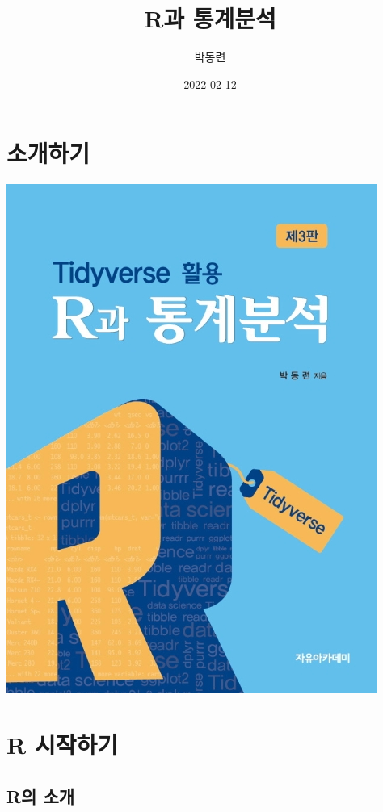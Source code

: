 \documentclass[
]{book}
\title{R과 통계분석}
\author{박동련}
\date{2022-02-12}
\begin{document}
\maketitle

{
\setcounter{tocdepth}{1}
\tableofcontents
}
\hypertarget{uxc18cuxac1cuxd558uxae30}{%
\chapter*{소개하기}\label{uxc18cuxac1cuxd558uxae30}}

\includegraphics{Figure/cover.jpg}

\hypertarget{r-uxc2dcuxc791uxd558uxae30}{%
\chapter{R 시작하기}\label{r-uxc2dcuxc791uxd558uxae30}}

\hypertarget{ruxc758-uxc18cuxac1c}{%
\section{R의 소개}\label{ruxc758-uxc18cuxac1c}}
\end{document}
